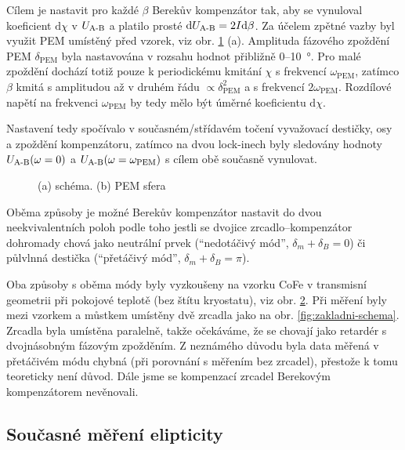 Cílem je nastavit pro každé $\beta$ Berekův kompenzátor tak, aby se vynuloval koeficient $\textrm{d}\chi$ v $U_\textrm{A-B}$ a platilo prosté $\textrm{d}U_\textrm{A-B}=2I\textrm{d}\beta$.
Za účelem zpětné vazby byl využit PEM umístěný před vzorek, viz obr. \ref{fig:dynamicky-berek} (a).
Amplituda fázového zpoždění PEM $\delta_\textrm{PEM}$ byla nastavována v rozsahu hodnot přibližně 0--\SI{10}{\degree}.
Pro malé zpoždění dochází totiž pouze k periodickému kmitání $\chi$ s frekvencí $\omega_\textrm{PEM}$, zatímco $\beta$ kmitá s amplitudou až v druhém řádu $\propto\delta_\textrm{PEM}^2$ a s frekvencí $2\omega_\textrm{PEM}$.
Rozdílové napětí na frekvenci $\omega_\textrm{PEM}$ by tedy mělo být úměrné koeficientu $\textrm{d}\chi$.

Nastavení tedy spočívalo v současném/střídavém točení vyvažovací destičky, osy a zpoždění kompenzátoru, zatímco na dvou lock-inech byly sledovány hodnoty $U_\textrm{A-B}(\omega=0)$ a $U_\textrm{A-B}(\omega=\omega_\textrm{PEM})$ s cílem obě současně vynulovat.

\begin{figure}[htbp]
    \centering
    \missingfigure{}
    \caption{(a) schéma. (b) PEM sfera}
    \label{fig:dynamicky-berek}
\end{figure}

Oběma způsoby je možné Berekův kompenzátor nastavit do dvou neekvivalentních poloh podle toho jestli se dvojice zrcadlo--kompenzátor dohromady chová jako neutrální prvek (``nedotáčivý mód'', $\delta_m+\delta_B=0$) či půlvlnná destička (``přetáčivý mód'', $\delta_m+\delta_B=\pi$).

Oba způsoby s oběma módy byly vyzkoušeny na vzorku CoFe v transmisní geometrii při pokojové teplotě (bez štítu kryostatu), viz obr. \ref{fig:g:mustek-kompenzace-berek-vysledky}.
Při měření byly mezi vzorkem a můstkem umístěny dvě zrcadla jako na obr. \ref{fig:zakladni-schema}.
Zrcadla byla umístěna paralelně, takže očekáváme, že se chovají jako retardér s dvojnásobným fázovým zpožděním.
Z neznámého důvodu byla data měřená v přetáčivém módu chybná (při porovnání s měřením bez zrcadel), přestože k tomu teoreticky není důvod.
Dále jsme se kompenzací zrcadel Berekovým kompenzátorem nevěnovali.

\begin{figure}[htbp]
    \centering
    \missingfigure{}
    \caption{}
    \label{fig:g:mustek-kompenzace-berek-vysledky}
\end{figure}

\subsection{Současné měření elipticity}
\label{chap:elipticita}


